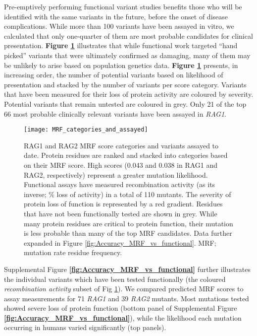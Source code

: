 \documentclass[preprint,11pt,fleqn]{elsarticle}
\begin{document}
Pre-emptively performing functional variant studies benefits those who will be identified with the same variants in the future, before the onset of disease complications.
While more than 100 variants have been assayed in vitro, we calculated that only one-quarter of them are most probable candidates for clinical presentation. 
\textbf{Figure 
\ref{fig:MRF_categories_and_assayed}}
illustrates that while functional work targeted ``hand picked'' variants that were ultimately confirmed as damaging, many of them may be unlikely to arise based on population genetics data. 
\textbf{Figure 
\ref{fig:MRF_categories_and_assayed}}
presents, in increasing order, the number of potential variants based on likelihood of presentation and stacked by the number of variants per score category.
Variants that have been measured for their loss of protein activity are coloured by severity.
Potential variants that remain untested are coloured in grey.
Only 21 of the top 66 most probable clinically relevant variants have been assayed in \textit{RAG1}.  
 
\begin{figure}[h]
\centering
	\texttt{[image: MRF\_categories\_and\_assayed]}
	\caption{RAG1 and RAG2 MRF score categories and variants assayed to date.  Protein residues are ranked and stacked into categories based on their MRF score. High scores (0.043 and 0.038 in RAG1 and RAG2, respectively) represent a greater mutation likelihood. Functional assays have measured recombination activity (as its inverse; \% loss of activity) in a total of 110 mutants. The severity of protein loss of function is represented by a red gradient. Residues that have not been functionally tested are shown in grey. While many protein residues are critical to protein function, their mutation is less probable than many of the top MRF candidates. Data further expanded in Figure
	\ref{fig:Accuracy_MRF_vs_functional}.
	MRF; mutation rate residue frequency.}
	\label{fig:MRF_categories_and_assayed}
\end{figure}

Supplemental Figure 
\textbf{\ref{fig:Accuracy_MRF_vs_functional}} 
further illustrates the individual variants which have been tested functionally (the coloured \textit{recombination activity} subset of Fig \ref{fig:MRF_categories_and_assayed}). 
We compared predicted MRF scores to assay measurements for 71 \textit{RAG1} and 39 \textit{RAG2} mutants.
Most mutations tested showed severe loss of protein function (bottom panel of Supplemental Figure 
\textbf{\ref{fig:Accuracy_MRF_vs_functional}}), while the likelihood each mutation occurring in humans varied significantly (top panels).
\end{document}
